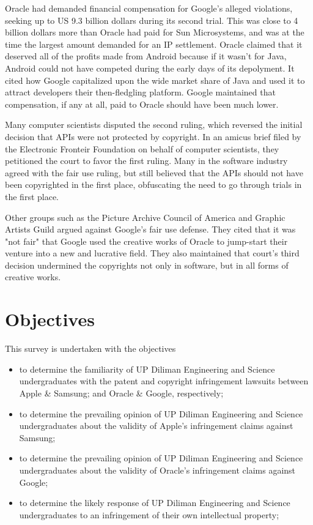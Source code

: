 \documentclass[prodmode,cs196]{acmlarge}
\begin{document}
Oracle had demanded financial compensation for Google's alleged violations, seeking up to US 9.3 billion dollars during its second trial. This was close to 4 billion dollars more than Oracle had paid for Sun Microsystems, and was at the time the largest amount demanded for an IP settlement. Oracle claimed that it deserved all of the profits made from Android because if it wasn't for Java, Android could not have competed during the early days of its depolyment. It cited how Google capitalized upon the wide market share of Java and used it to attract developers their then-fledgling platform. Google maintained that compensation, if any at all, paid to Oracle should have been much lower.\cite{Mullin2016}

Many computer scientists disputed the second ruling, which reversed the initial decision that APIs were not protected by copyright. In an amicus brief filed by the Electronic Fronteir Foundation on behalf of computer scientists, they petitioned the court to favor the first ruling. Many in the software industry agreed with the fair use ruling, but still believed that the APIs should not have been copyrighted in the first place, obfuscating the need to go through trials in the first place. \cite{EFFAmicusBrief}

Other groups such as the Picture Archive Council of America and Graphic Artists Guild argued against Google's fair use defense. They cited that it was "not fair" that Google used the creative works of Oracle to jump-start their venture into a new and lucrative field. They also maintained that court's third decision undermined the copyrights not only in software, but in all forms of creative works. \cite{ProOracleAmicusBrief}

\section{Objectives}

This survey is undertaken with the objectives

\begin{itemize}
	\item{to determine the familiarity of UP Diliman Engineering and Science undergraduates with the patent and copyright infringement lawsuits between Apple \& Samsung; and Oracle \& Google, respectively;}
	\item{to determine the prevailing opinion of UP Diliman Engineering and Science undergraduates about the validity of Apple's infringement claims against Samsung;}
	\item{to determine the prevailing opinion of UP Diliman Engineering and Science undergraduates about the validity of Oracle's infringement claims against Google;}
	\item{to determine the likely response of UP Diliman Engineering and Science undergraduates to an infringement of their own intellectual property;}
\end{itemize}
\end{document}
